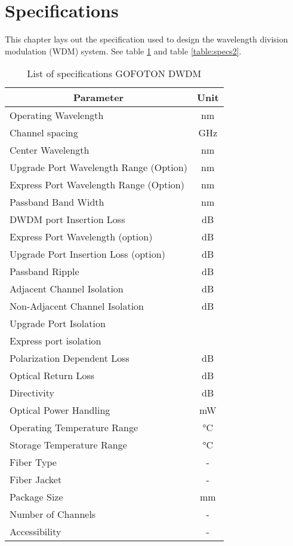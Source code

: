 \section{Specifications}
\label{sec:specifications}
This chapter lays out the specification used to design the wavelength division modulation (WDM) system. See table \ref{table:specs1} and table \ref{table:specs2}.

\begin{table}[!ht]
	\centering
	\cite{noauthor_gofoton_nodate}
	\begin{tabular} {|l|c|}
		\hline
		\multicolumn{1}{|c|}{\textbf{Parameter}} & \textbf{Unit} \\ \hline\hline
		Operating Wavelength & \unit{\nm} \\ \hline
		Channel spacing & \unit{\GHz} \\ \hline
		Center Wavelength & \unit{\nm} \\ \hline
		Upgrade Port Wavelength Range (Option) & \unit{\nm} \\ \hline
		Express Port Wavelength Range (Option) & \unit{\nm} \\ \hline
		Passband Band Width & \unit{\nm} \\ \hline
		DWDM port Insertion Loss & \unit{\dB} \\ \hline
		Express Port Wavelength (option) & \unit{\dB} \\ \hline
		Upgrade Port Insertion Loss (option) & \unit{\dB} \\ \hline
		Passband Ripple & \unit{\dB} \\ \hline
		Adjacent Channel Isolation & \unit{\dB} \\ \hline
		Non-Adjacent Channel Isolation & \unit{\dB} \\ \hline
		Upgrade Port Isolation & \\ \hline
		Express port isolation & \\ \hline
		Polarization Dependent Loss & \unit{\dB} \\ \hline
		Optical Return Loss & \unit{\dB} \\ \hline
		Directivity & \unit{\dB} \\ \hline
		Optical Power Handling & \unit{\mW} \\ \hline
		Operating Temperature Range & \unit{\degreeCelsius} \\ \hline
		Storage Temperature Range & \unit{\degreeCelsius} \\ \hline
		Fiber Type & - \\ \hline
		Fiber Jacket & - \\ \hline
		Package Size & \unit{\mm} \\ \hline
		Number of Channels & - \\ \hline
		Accessibility & - \\ \hline
	\end{tabular}
	\caption{List of specifications GOFOTON DWDM}
	\label{table:specs1}
\end{table}

